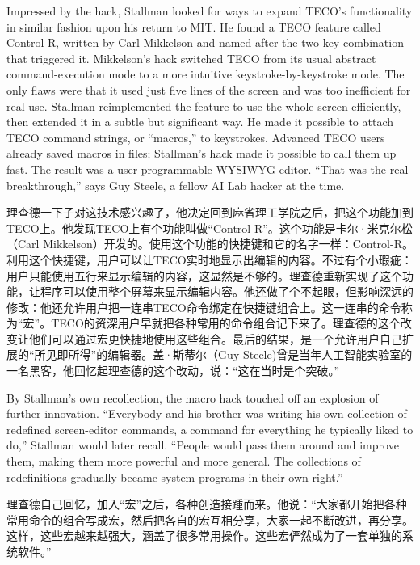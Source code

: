 \ifdefined\eng
Impressed by the hack, Stallman looked for ways to expand TECO's functionality in similar fashion upon his return to MIT. He found a TECO feature called Control-R, written by Carl Mikkelson and named after the two-key combination that triggered it. Mikkelson's hack switched TECO from its usual abstract command-execution mode to a more intuitive keystroke-by-keystroke mode. The only flaws were that it used just five lines of the screen and was too inefficient for real use. Stallman reimplemented the feature to use the whole screen efficiently, then
extended it in a subtle but significant way. He made it possible to attach TECO command strings, or ``macros,'' to keystrokes. Advanced TECO users already saved macros in files; Stallman's hack made it possible to call them up fast. The result was a user-programmable WYSIWYG editor. ``That was the real breakthrough,'' says Guy Steele, a fellow AI Lab hacker at the time.
\fi

\ifdefined\chs
理查德一下子对这技术感兴趣了，他决定回到麻省理工学院之后，把这个功能加到TECO上。他发现TECO上有个功能叫做“Control-R”。这个功能是卡尔·米克尔松（Carl Mikkelson）开发的。使用这个功能的快捷键和它的名字一样：Control-R。利用这个快捷键，用户可以让TECO实时地显示出编辑的内容。不过有个小瑕疵：用户只能使用五行来显示编辑的内容，这显然是不够的。理查德重新实现了这个功能，让程序可以使用整个屏幕来显示编辑内容。他还做了个不起眼，但影响深远的修改：他还允许用户把一连串TECO命令绑定在快捷键组合上。这一连串的命令称为“宏”。TECO的资深用户早就把各种常用的命令组合记下来了。理查德的这个改变让他们可以通过宏更快捷地使用这些组合。最后的结果，是一个允许用户自己扩展的“所见即所得”的编辑器。盖·斯蒂尔（Guy Steele)曾是当年人工智能实验室的一名黑客，他回忆起理查德的这个改动，说：“这在当时是个突破。”
\fi

\ifdefined\eng
By Stallman's own recollection, the macro hack touched off an explosion of further innovation. ``Everybody and his brother was writing his own collection of redefined screen-editor commands, a command for everything he typically liked to do,'' Stallman would later recall. ``People would pass them around and improve them, making them more powerful and more general. The collections of redefinitions gradually became system programs in their own right.''
\fi

\ifdefined\chs
理查德自己回忆，加入“宏”之后，各种创造接踵而来。他说：“大家都开始把各种常用命令的组合写成宏，然后把各自的宏互相分享，大家一起不断改进，再分享。这样，这些宏越来越强大，涵盖了很多常用操作。这些宏俨然成为了一套单独的系统软件。”
\fi

